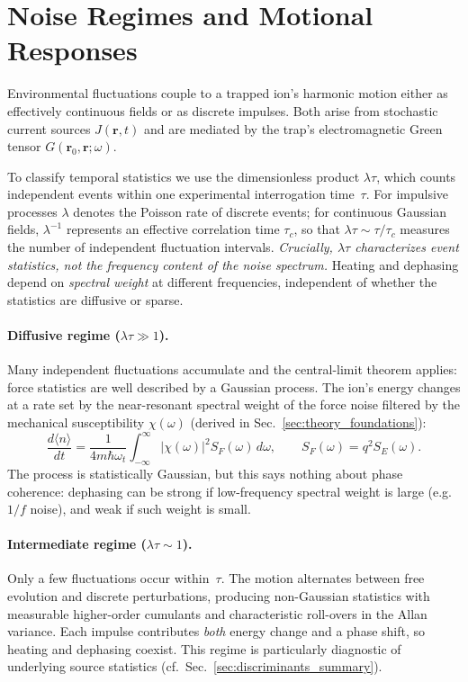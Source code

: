 \section{Noise Regimes and Motional Responses}
\label{sec:noise_regimes}

Environmental fluctuations couple to a trapped ion’s harmonic motion either
as effectively continuous fields or as discrete impulses.  Both arise from
stochastic current sources $J(\mathbf r,t)$ and are mediated by the trap’s
electromagnetic Green tensor $G(\mathbf r_0,\mathbf r;\omega)$.

To classify temporal statistics we use the dimensionless product
$\lambda\tau$, which counts independent events within one experimental
interrogation time~$\tau$.  For impulsive processes $\lambda$ denotes the
Poisson rate of discrete events; for continuous Gaussian fields,
$\lambda^{-1}$ represents an effective correlation time $\tau_c$, so that
$\lambda\tau\!\sim\!\tau/\tau_c$ measures the number of independent
fluctuation intervals.  \emph{Crucially, $\lambda\tau$ characterizes event
statistics, not the frequency content of the noise spectrum.}
Heating and dephasing depend on \emph{spectral weight} at different
frequencies, independent of whether the statistics are diffusive or sparse.

\paragraph{Diffusive regime ($\lambda\tau\!\gg\!1$).}
Many independent fluctuations accumulate and the central-limit theorem
applies: force statistics are well described by a Gaussian process.
The ion’s energy changes at a rate set by the near-resonant spectral weight
of the force noise filtered by the mechanical susceptibility
$\chi(\omega)$ (derived in Sec.~\ref{sec:theory_foundations}):
\[
\frac{d\langle n\rangle}{dt}
 = \frac{1}{4 m \hbar \omega_t}\!\int_{-\infty}^{\infty}\!
   |\chi(\omega)|^{2} S_F(\omega)\,d\omega,
\qquad S_F(\omega)=q^{2}S_E(\omega).
\]
The process is statistically Gaussian, but this says nothing about phase
coherence: dephasing can be strong if low-frequency spectral weight is large
(e.g.\ $1/f$ noise), and weak if such weight is small.

\paragraph{Intermediate regime ($\lambda\tau\!\sim\!1$).}
Only a few fluctuations occur within~$\tau$.  The motion alternates between
free evolution and discrete perturbations, producing non-Gaussian
statistics with measurable higher-order cumulants and characteristic
roll-overs in the Allan variance.  Each impulse contributes \emph{both}
energy change and a phase shift, so heating and dephasing coexist.
This regime is particularly diagnostic of underlying source statistics
(cf.\ Sec.~\ref{sec:discriminants_summary}).


